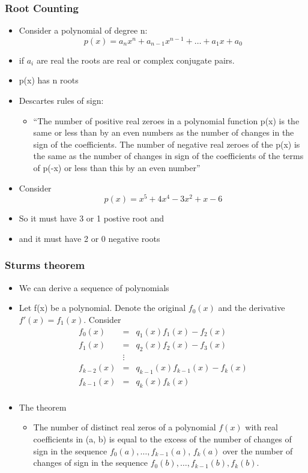 \documentclass[10pt]{beamer}
\begin{document}
\begin{frame}
  \frametitle{Root Counting}
  \begin{itemize}
  \item Consider a polynomial of degree n:
    \[
      p(x) = a_n x^n + a_{n-1} x^{n-1} + \ldots + a_1 x + a_0
    \]
  \item if $a_i$ are real the roots are real or complex conjugate pairs. 
  \item p(x) has n roots
  \item Descartes rules of sign:
    \begin{itemize}
    \item ``The number of positive real zeroes in a polynomial
      function p(x) is the same or less than by an even numbers as the
      number of changes in the sign of the coefficients. The number of
      negative real zeroes of the p(x) is the same as the number of
      changes in sign of the coefficients of the terms of p(-x) or
      less than this by an even number''
    \end{itemize}
  \item Consider
    \[
      p(x) = x^5 + 4 x^4 - 3 x^2 + x -6
    \]
  \item So it must have 3 or 1 postive root and
  \item and it must have 2 or 0 negative roots
  \end{itemize}
\end{frame}

\begin{frame}
  \frametitle{Sturms theorem}
  \begin{itemize}
  \item We can derive a sequence of polynomials
  \item Let f(x) be a polynomial. Denote the original $f_0(x)$ and the
    derivative $f'(x) = f_1(x)$. Consider
    \[
      \begin{array}{rcl}
        f_0(x)      &=& q_1(x) f_1(x) - f_2(x) \\
        f_1(x)      &=& q_2(x) f_2(x) - f_3(x) \\
                 &\vdots& \\
        f_{k-2}(x) &=& q_{k-1}(x) f_{k-1}(x) - f_k(x) \\
        f_{k-1}(x) &=& q_k(x) f_k(x) \\
      \end{array}
    \]
  \item The theorem
    \begin{itemize}
    \item The number of distinct real zeros of a polynomial $f(x)$
      with real coefficients in (a, b) is equal to the excess of the
      number of changes of sign in the sequence $f_0(a), \ldots ,
      f_{k−1}(a)$, $f_k(a)$ over the number of changes of sign in the
      sequence $f_0(b), \ldots , f_{k−1}(b), f_k(b)$.
    \end{itemize}
  \end{itemize}
\end{frame}
\end{document}
